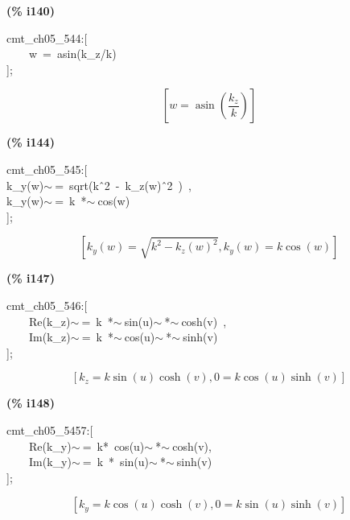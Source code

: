 \documentclass[fleqn]{article}
\begin{document}
\noindent
\begin{minipage}[t]{4.000000em}\color{red}\bfseries
(\% i140)	
\end{minipage}
\begin{minipage}[t]{\textwidth}\color{blue}
cmt\_ch05\_544:[\\
\ \ \ \ w\ =\ asin(k\_z/k)\\
];
\end{minipage}
\[\displaystyle \tag{\% o140} 
\left[ w=\operatorname{asin}\left( \frac{{k_z}}{k}\right) \right] \mbox{}
\]


\noindent
\begin{minipage}[t]{4.000000em}\color{red}\bfseries
(\% i144)	
\end{minipage}
\begin{minipage}[t]{\textwidth}\color{blue}
cmt\_ch05\_545:[\\
k\_y(w)\ensuremath{\sim\ }=\ sqrt(k\^\ 2\ -\ k\_z(w)\^\ 2\ )\ ,\\
k\_y(w)\ensuremath{\sim\ }=\ k\ *\ensuremath{\sim\ }cos(w)\\
];
\end{minipage}
\[\displaystyle \tag{\% o144} 
\left[ {k_y}(w)=\sqrt{{{k}^{2}}-{{{k_z}(w)}^{2}}}\operatorname{,}{k_y}(w)=k \cos{(w)}\right] \mbox{}
\]


\noindent
\begin{minipage}[t]{4.000000em}\color{red}\bfseries
(\% i147)	
\end{minipage}
\begin{minipage}[t]{\textwidth}\color{blue}
cmt\_ch05\_546:[\\
\ \ \ \ Re(k\_z)\ensuremath{\sim\ }=\ k\ *\ensuremath{\sim\ }sin(u)\ensuremath{\sim\ }*\ensuremath{\sim\ }cosh(v)\ ,\ \\
\ \ \ \ Im(k\_z)\ensuremath{\sim\ }=\ k\ *\ensuremath{\sim\ }cos(u)\ensuremath{\sim\ }*\ensuremath{\sim\ }sinh(v)\\
];
\end{minipage}
\[\displaystyle \tag{\% o147} 
\left[ {k_z}=k \sin{(u)} \cosh{(v)}\operatorname{,}0=k \cos{(u)} \sinh{(v)}\right] \mbox{}
\]


\noindent
\begin{minipage}[t]{4.000000em}\color{red}\bfseries
(\% i148)	
\end{minipage}
\begin{minipage}[t]{\textwidth}\color{blue}
cmt\_ch05\_5457:[\\
\ \ \ \ Re(k\_y)\ensuremath{\sim\ }=\ k*\ cos(u)\ensuremath{\sim\ }*\ensuremath{\sim\ }cosh(v),\\
\ \ \ \ Im(k\_y)\ensuremath{\sim\ }=\ k\ *\ sin(u)\ensuremath{\sim\ }*\ensuremath{\sim\ }sinh(v)\\
];
\end{minipage}
\[\displaystyle \tag{\% o148} 
\left[ {k_y}=k \cos{(u)} \cosh{(v)}\operatorname{,}0=k \sin{(u)} \sinh{(v)}\right] \mbox{}
\]
\end{document}
